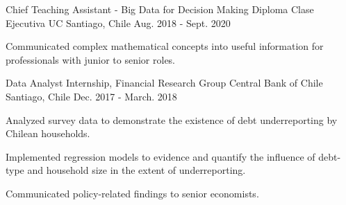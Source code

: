 \begin{cventries}

\cventry
{Chief Teaching Assistant - Big Data for Decision Making Diploma}
{Clase Ejecutiva UC} %
{Santiago, Chile} %
{Aug. 2018 - Sept. 2020} %
{
  \begin{cvitems} %
    \item {Communicated complex mathematical concepts into useful information for professionals with junior to senior roles.}
  \end{cvitems}
}

  \cventry
    {Data Analyst Internship, Financial Research Group} %
    {Central Bank of Chile} %
    {Santiago, Chile} %
    {Dec. 2017 - March. 2018} %
    {
      \begin{cvitems} %
        \item {Analyzed survey data to demonstrate the existence of debt underreporting by Chilean households.}
        \item {Implemented regression models to evidence and quantify the influence of debt-type and household size in the extent of underreporting.}
        \item {Communicated policy-related findings to senior economists.}
      \end{cvitems}
    }
\end{cventries}
